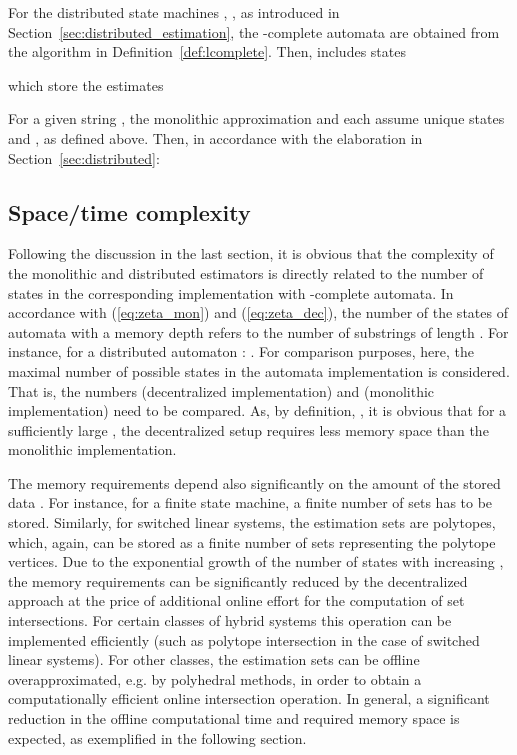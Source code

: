 \documentclass[a4paper, 10pt, conference]{ieeeconf}
\begin{document}
For the distributed state machines , , as introduced in Section~\ref{sec:distributed_estimation}, the -complete automata  are obtained from the algorithm in Definition~\ref{def:lcomplete}. Then,  includes states

which store the estimates

For a given string , the monolithic approximation  and each  assume unique states  and , as defined above. Then, in accordance with the elaboration in Section~\ref{sec:distributed}:







\subsection{Space/time complexity}\label{sec:complexity}
Following the discussion in the last section, it is obvious that the complexity of the monolithic and distributed estimators is directly related to the number of states in the corresponding implementation with -complete automata. In accordance with (\ref{eq:zeta_mon}) and (\ref{eq:zeta_dec}), the number  of the states of automata with a memory depth  refers to the number of substrings of length . For instance, for a distributed automaton : .
For comparison purposes, here, the maximal number of possible states in the automata implementation is considered. That is, the numbers  (decentralized implementation) and  (monolithic implementation) need to be compared. As, by definition, , it is obvious that for a sufficiently large , the decentralized setup requires less memory space than the monolithic implementation. 

The memory requirements depend also significantly on the amount of the stored data . For instance, for a finite state machine, a finite number of sets has to be stored. Similarly, for switched linear systems, the estimation sets are polytopes, which, again, can be stored as a finite number of sets representing the polytope vertices. Due to the exponential growth of the number of states with increasing , the memory requirements can be significantly reduced by the decentralized approach at the price of additional online effort for the computation of set intersections. For certain classes of hybrid systems this operation can be implemented efficiently (such as polytope intersection in the case of switched linear systems). For other classes, the estimation sets can be offline overapproximated, e.g. by polyhedral methods, in order to obtain a computationally efficient online intersection operation. In general, a significant reduction in the offline computational time and required memory space is expected, as exemplified in the following section. 
\end{document}
